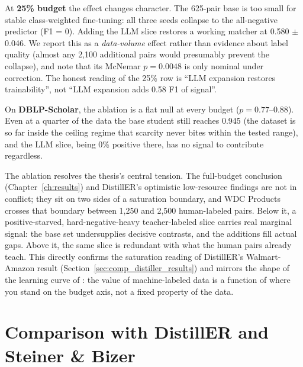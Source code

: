 \documentclass[a4paper,oneside,bibliography=totoc]{scrbook}
\begin{document}
At \textbf{25\% budget} the effect changes character. The 625-pair base is too small for stable class-weighted fine-tuning: all three seeds collapse to the all-negative predictor (F1 = 0). Adding the LLM slice restores a working matcher at 0.580 $\pm$ 0.046. We report this as a \emph{data-volume} effect rather than evidence about label quality (almost any 2{,}100 additional pairs would presumably prevent the collapse), and note that its McNemar $p = 0.0048$ is only nominal under correction. The honest reading of the 25\% row is ``LLM expansion restores trainability'', not ``LLM expansion adds 0.58 F1 of signal''.

On \textbf{DBLP-Scholar}, the ablation is a flat null at every budget ($p = 0.77$--$0.88$). Even at a quarter of the data the base student still reaches 0.945 (the dataset is so far inside the ceiling regime that scarcity never bites within the tested range), and the LLM slice, being 0\% positive there, has no signal to contribute regardless.

The ablation resolves the thesis's central tension. The full-budget conclusion (Chapter~\ref{ch:results}) and DistillER's optimistic low-resource findings are not in conflict; they sit on two sides of a saturation boundary, and WDC Products crosses that boundary between 1{,}250 and 2{,}500 human-labeled pairs. Below it, a positive-starved, hard-negative-heavy teacher-labeled slice carries real marginal signal: the base set undersupplies decisive contrasts, and the additions fill actual gaps. Above it, the same slice is redundant with what the human pairs already teach. This directly confirms the saturation reading of DistillER's Walmart-Amazon result (Section~\ref{sec:comp_distiller_results}) and mirrors the shape of the learning curve of \citet{steiner2026labeling}: the value of machine-labeled data is a function of where you stand on the budget axis, not a fixed property of the data.

\chapter{Comparison with DistillER and Steiner \& Bizer}
\label{ch:comparison}
\end{document}
